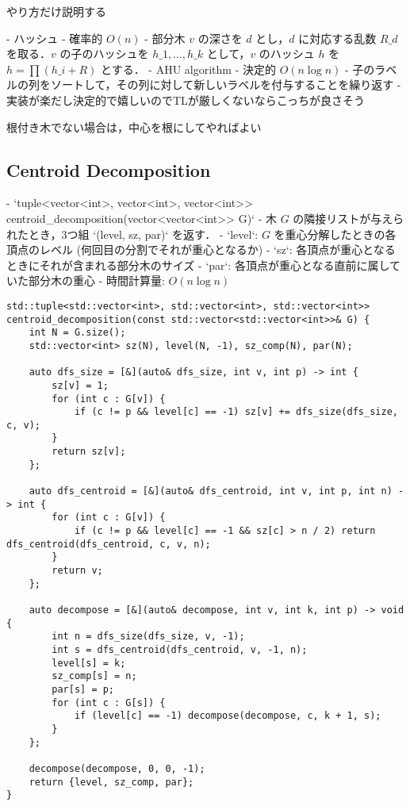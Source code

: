 \begin{small}
\begin{markdown}
やり方だけ説明する

- ハッシュ
    - 確率的 $O(n)$
    - 部分木 $v$ の深さを $d$ とし，$d$ に対応する乱数 $R\_d$ を取る．$v$ の子のハッシュを $h\_1,\dots,h\_k$ として，$v$ のハッシュ $h$ を $h=\prod (h\_i+R)$ とする．
- AHU algorithm
    - 決定的 $O(n\log n)$
    - 子のラベルの列をソートして，その列に対して新しいラベルを付与することを繰り返す
    - 実装が楽だし決定的で嬉しいのでTLが厳しくないならこっちが良さそう

根付き木でない場合は，中心を根にしてやればよい
\end{markdown}
\end{small}

\subsection{Centroid Decomposition}

\begin{small}
\begin{markdown}
- `tuple<vector<int>, vector<int>, vector<int>> centroid\_decomposition(vector<vector<int>> G)`
  - 木 $G$ の隣接リストが与えられたとき，3つ組 `(level, sz, par)` を返す．
    - `level`: $G$ を重心分解したときの各頂点のレベル (何回目の分割でそれが重心となるか)
    - `sz`: 各頂点が重心となるときにそれが含まれる部分木のサイズ
    - `par`: 各頂点が重心となる直前に属していた部分木の重心
  - 時間計算量: $O(n\log n)$

\end{markdown}
\end{small}

\begin{lstlisting}
std::tuple<std::vector<int>, std::vector<int>, std::vector<int>> centroid_decomposition(const std::vector<std::vector<int>>& G) {
    int N = G.size();
    std::vector<int> sz(N), level(N, -1), sz_comp(N), par(N);

    auto dfs_size = [&](auto& dfs_size, int v, int p) -> int {
        sz[v] = 1;
        for (int c : G[v]) {
            if (c != p && level[c] == -1) sz[v] += dfs_size(dfs_size, c, v);
        }
        return sz[v];
    };

    auto dfs_centroid = [&](auto& dfs_centroid, int v, int p, int n) -> int {
        for (int c : G[v]) {
            if (c != p && level[c] == -1 && sz[c] > n / 2) return dfs_centroid(dfs_centroid, c, v, n);
        }
        return v;
    };

    auto decompose = [&](auto& decompose, int v, int k, int p) -> void {
        int n = dfs_size(dfs_size, v, -1);
        int s = dfs_centroid(dfs_centroid, v, -1, n);
        level[s] = k;
        sz_comp[s] = n;
        par[s] = p;
        for (int c : G[s]) {
            if (level[c] == -1) decompose(decompose, c, k + 1, s);
        }
    };

    decompose(decompose, 0, 0, -1);
    return {level, sz_comp, par};
}
\end{lstlisting}

